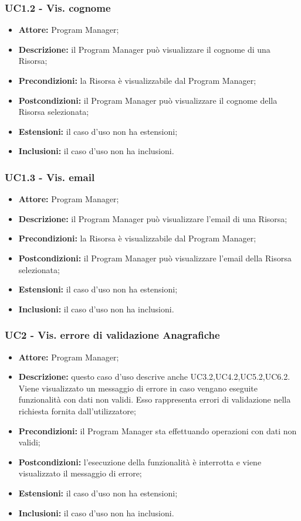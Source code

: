 \subsubsection*{UC1.2 - Vis. cognome}
\begin{itemize}[label=$\circ$]
\item \textbf{Attore:} Program Manager;
\item \textbf{Descrizione:} il Program Manager può visualizzare il cognome di una Risorsa;
\item \textbf{Precondizioni:}  la Risorsa è visualizzabile dal Program Manager;
\item \textbf{Postcondizioni:} il Program Manager può visualizzare il cognome della Risorsa selezionata;
\item \textbf{Estensioni:} il caso d'uso non ha estensioni;
\item \textbf{Inclusioni:} il caso d'uso non ha inclusioni.
\end{itemize}

\subsubsection*{UC1.3 - Vis. email}
\begin{itemize}[label=$\circ$]
\item \textbf{Attore:} Program Manager;
\item \textbf{Descrizione:} il Program Manager può visualizzare l'email di una Risorsa;
\item \textbf{Precondizioni:}  la Risorsa è visualizzabile dal Program Manager;
\item \textbf{Postcondizioni:} il Program Manager può visualizzare l'email della Risorsa selezionata;
\item \textbf{Estensioni:} il caso d'uso non ha estensioni;
\item \textbf{Inclusioni:} il caso d'uso non ha inclusioni.
\end{itemize}

\subsubsection*{UC2 - Vis. errore di validazione Anagrafiche}
\begin{itemize}[label=$\circ$]
\item \textbf{Attore:} Program Manager;
\item \textbf{Descrizione:} questo caso d'uso descrive anche UC3.2,UC4.2,UC5.2,UC6.2. Viene visualizzato un messaggio di errore in caso vengano eseguite funzionalità con dati non validi. Esso rappresenta errori di validazione nella richiesta fornita dall'utilizzatore;
\item \textbf{Precondizioni:} il Program Manager sta effettuando operazioni con dati non validi;
\item \textbf{Postcondizioni:} l'esecuzione della funzionalità è interrotta e viene visualizzato il messaggio di errore;
\item \textbf{Estensioni:} il caso d'uso non ha estensioni;
\item \textbf{Inclusioni:} il caso d'uso non ha inclusioni.
\end{itemize}

